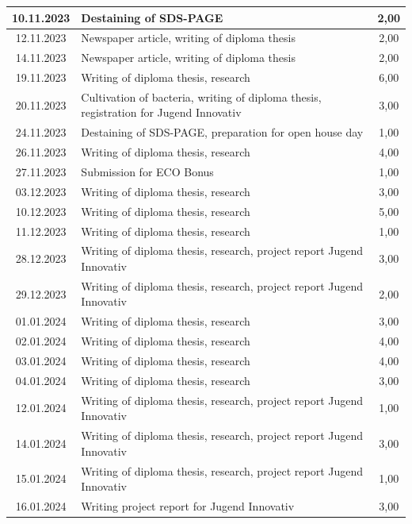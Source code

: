 \begin{longtable}{|c|p{9cm}|c|}
        10.11.2023 & Destaining of SDS-PAGE & 2,00 \\ \hline
        12.11.2023 & Newspaper article, writing of diploma thesis & 2,00 \\ \hline
        14.11.2023 & Newspaper article, writing of diploma thesis & 2,00 \\ \hline
        19.11.2023 & Writing of diploma thesis, research & 6,00 \\ \hline
        20.11.2023 & Cultivation of bacteria, writing of diploma thesis, registration for Jugend Innovativ & 3,00 \\ \hline
        24.11.2023 & Destaining of SDS-PAGE, preparation for open house day & 1,00 \\ \hline
        26.11.2023 & Writing of diploma thesis, research & 4,00 \\ \hline
        27.11.2023 & Submission for ECO Bonus & 1,00 \\ \hline
        03.12.2023 & Writing of diploma thesis, research & 3,00 \\ \hline
        10.12.2023 & Writing of diploma thesis, research & 5,00 \\ \hline
        11.12.2023 & Writing of diploma thesis, research & 1,00 \\ \hline
        28.12.2023 & Writing of diploma thesis, research, project report Jugend Innovativ & 3,00 \\ \hline
        29.12.2023 & Writing of diploma thesis, research, project report Jugend Innovativ & 2,00 \\ \hline
        01.01.2024 & Writing of diploma thesis, research & 3,00 \\ \hline
        02.01.2024 & Writing of diploma thesis, research & 4,00 \\ \hline
        03.01.2024 & Writing of diploma thesis, research & 4,00 \\ \hline
        04.01.2024 & Writing of diploma thesis, research & 3,00 \\ \hline
        12.01.2024 & Writing of diploma thesis, research, project report Jugend Innovativ & 1,00 \\ \hline
        14.01.2024 & Writing of diploma thesis, research, project report Jugend Innovativ & 3,00 \\ \hline
        15.01.2024 & Writing of diploma thesis, research, project report Jugend Innovativ & 1,00 \\ \hline
        16.01.2024 & Writing project report for Jugend Innovativ & 3,00 \\ \hline

\end{longtable}
